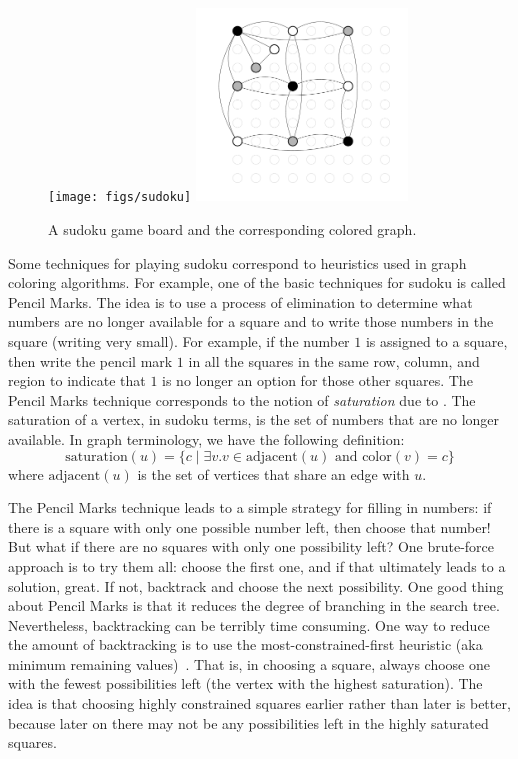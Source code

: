 \documentclass[7x10]{TimesAPriori_MIT}%
\numberwithin{theorem}{chapter}
\numberwithin{definition}{chapter}
\numberwithin{equation}{chapter}
\begin{document}
\begin{figure}[tbp]
\begin{tcolorbox}[colback=white]
\texttt{[image: figs/sudoku]}
\includegraphics[width=0.5\textwidth]{figs/sudoku-graph-bw}
\end{tcolorbox}
\caption{A sudoku game board and the corresponding colored graph.}
\label{fig:sudoku-graph}
\end{figure}

Some techniques for playing sudoku correspond to heuristics used in
graph coloring algorithms.  For example, one of the basic techniques
for sudoku is called Pencil Marks. The idea is to use a process of
elimination to determine what numbers are no longer available for a
square and to write those numbers in the square (writing very
small). For example, if the number $1$ is assigned to a square, then
write the pencil mark $1$ in all the squares in the same row, column,
and region to indicate that $1$ is no longer an option for those other
squares.
%
The Pencil Marks technique corresponds to the notion of
\emph{saturation} due to \citet{Brelaz:1979eu}.  The
saturation of a vertex, in sudoku terms, is the set of numbers that
are no longer available. In graph terminology, we have the following
definition:
\begin{equation*}
  \mathrm{saturation}(u) = \{ c \;|\; \exists v. v \in \mathrm{adjacent}(u)
     \text{ and } \mathrm{color}(v) = c \}
\end{equation*}
where $\mathrm{adjacent}(u)$ is the set of vertices that share an
edge with $u$.

The Pencil Marks technique leads to a simple strategy for filling in
numbers: if there is a square with only one possible number left, then
choose that number! But what if there are no squares with only one
possibility left? One brute-force approach is to try them all: choose
the first one, and if that ultimately leads to a solution, great.  If
not, backtrack and choose the next possibility.  One good thing about
Pencil Marks is that it reduces the degree of branching in the search
tree. Nevertheless, backtracking can be terribly time consuming. One
way to reduce the amount of backtracking is to use the
most-constrained-first heuristic (aka minimum remaining
values)~\citep{Russell2003}.  That is, in choosing a square, always
choose one with the fewest possibilities left (the vertex with the
highest saturation).  The idea is that choosing highly constrained
squares earlier rather than later is better, because later on there may
not be any possibilities left in the highly saturated squares.
\end{document}
